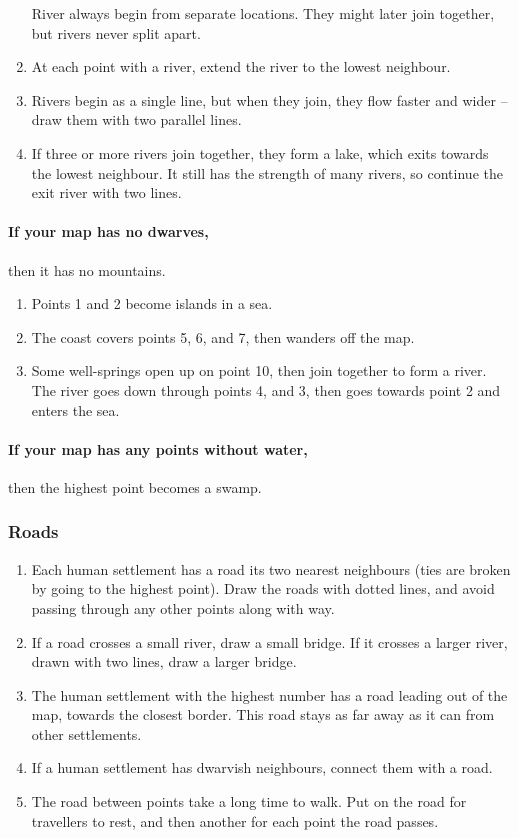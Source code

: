 \begin{multicols}{2}
\begin{enumerate}
  River always begin from separate locations.
  They might later join together, but rivers never split apart.
  \item
  At each point with a river, extend the river to the lowest neighbour.
  \item
  Rivers begin as a single line, but when they join, they flow faster and wider -- draw them with two parallel lines.
  \item
  If three or more rivers join together, they form a lake, which exits towards the lowest neighbour.
  It still has the strength of many rivers, so continue the exit river with two lines.
\end{enumerate}

\paragraph{If your map has no dwarves,}
then it has no mountains.

\begin{enumerate}
  \item
  Points 1 and 2 become islands in a sea.
  \item
  The coast covers points 5, 6, and 7, then wanders off the map.
  \item
  Some well-springs open up on point 10, then join together to form a river.
  The river goes down through points 4, and 3, then goes towards point 2 and enters the sea.
\end{enumerate}

\paragraph{If your map has any points without water,}
then the highest point becomes a swamp.

\subsubsection{Roads}

\begin{enumerate}
  \item
  Each human settlement has a road its two nearest neighbours (ties are broken by going to the highest point).
  Draw the roads with dotted lines, and avoid passing through any other points along with way.
  \item
  If a road crosses a small river, draw a small bridge.
  If it crosses a larger river, drawn with two lines, draw a larger bridge.
  \item
  The human settlement with the highest number has a road leading out of the map, towards the closest border.
  This road stays as far away as it can from other settlements.
  \label{roadOut}
  \item
  If a human settlement has dwarvish neighbours, connect them with a road.
  \item
  The road between points take a long time to walk.
  Put  on the road for travellers to rest, and then another for each point the road passes.
\end{enumerate}


\end{multicols}
